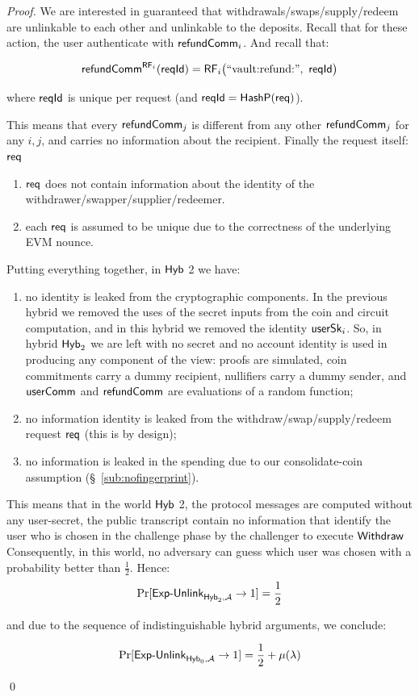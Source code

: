 \begin{proof}
We are interested in guaranteed that  withdrawals/swaps/supply/redeem  are unlinkable to each other and unlinkable to the deposits. Recall that for these action, the user authenticate with $\mathsf{refundComm}_i$.
And recall that:

$${\refundComm^{\RandFun_i}(\rid)} = \RandFun_i\bigl(\text{``vault:refund:''}\bc  \rid\bigr)$$


 where $\mathsf{reqId}$ is unique per request (and $\mathsf{reqId} = \mathsf{HashP}(\mathsf{req})$).

This means that every $\mathsf{refundComm}_j$ is  different from any other $\mathsf{refundComm}_j$ for any $i,j$, and carries no information about the recipient.
Finally the request itself: $\mathsf{req}$
\begin{enumerate}
    \item $\mathsf{req}$ does not contain information about the identity of the withdrawer/swapper/supplier/redeemer.
    \item each $\mathsf{req}$ is assumed to be  unique due to the correctness of the underlying  EVM nounce.
\end{enumerate}


Putting everything together, in $\mathsf{Hyb}$ 2 we have:

\begin{enumerate}[nosep,leftmargin=1.7em,topsep=3pt]
\item[(i)]  no identity is leaked from the cryptographic components. In the previous hybrid we removed the uses of the secret inputs from the coin and circuit computation, and in this hybrid we removed the identity $\mathsf{userSk}_i$.
So, in hybrid $\mathsf{Hyb}_2$ we are left with  no secret and no account identity is used in producing any component of the view: proofs are simulated, coin commitments carry a dummy recipient, nullifiers carry a  dummy sender, and $\mathsf{userComm}$ and $\mathsf{refundComm}$ are evaluations of a random function;

\item[(ii)] no information identity is  leaked from the withdraw/swap/supply/redeem request $\mathsf{req}$ (this is by design);
\item[(ii)] no information is leaked in the spending  due to our consolidate-coin assumption (\S~\ref{sub:nofingerprint}).
\end{enumerate}


This means that in  the world $\mathsf{Hyb}$ 2, the protocol messages    are computed without any user-secret,  the public transcript contain no information that identify the user who is chosen in the challenge phase by the challenger to execute $\mathsf{Withdraw}$
Consequently, in this world, no adversary can guess which user was chosen  with a probability better than  $\frac{1}{2}$.
Hence:  $$\Pr[\mathsf{Exp\text{-}Unlink}_{\mathsf{Hyb}_2,\mathcal{A}} \rightarrow 1] = \frac{1}{2}$$


and due to the sequence of indistinguishable hybrid arguments,  we conclude:

$$\Pr[\mathsf{Exp\text{-}Unlink}_{\mathsf{Hyb}_0,\mathcal{A}} \rightarrow 1] = \frac{1}{2}+\mu(\lambda)$$


\qed
\end{proof}


